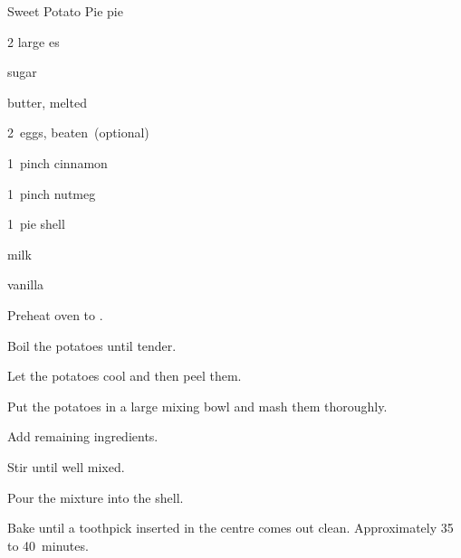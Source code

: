 \begin{recipe}{Sweet Potato Pie}{}{ pie}

\begin{ingredients}
\item 2 large es
\item {} sugar
\item \C{\quarter} butter, melted
\item 2~eggs, beaten~(optional)
\item 1~pinch cinnamon
\item 1~pinch nutmeg
\item 1~pie shell
\item \C{\quarter} milk
\item {} vanilla
\end{ingredients}

\begin{directions}
\item Preheat oven to .
\item Boil the potatoes until tender.
\item Let the potatoes cool and then peel them.
\item Put the potatoes in a large mixing bowl and mash them thoroughly.
\item Add remaining ingredients.
\item Stir until well mixed.
\item Pour the mixture into the shell.
\item Bake until a toothpick inserted in the centre comes out clean. Approximately 35 to 40~minutes.
\end{directions}

\end{recipe}
